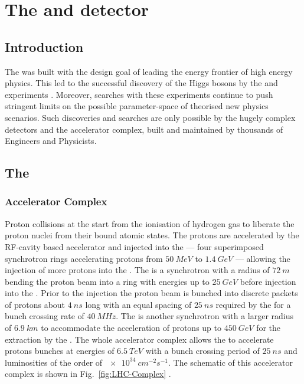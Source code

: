 \chapter{The \LHC and \CMS detector}
\label{chap:detector}


\section{Introduction}

The \LHC was built with the design goal of leading the energy frontier of high
energy physics. This led to the successful discovery of the Higgs bosons by the
\ATLAS \cite{Aad:1471031} and \CMS experiments \cite{Chatrchyan:1471016}.
Moreover, \BSM searches with these experiments continue to push stringent
limits on the possible parameter-space of theorised new physics scenarios. Such
discoveries and searches are only possible by the hugely complex detectors
and the \LHC accelerator complex, built and maintained by thousands of Engineers
and Physicists.

\section{The \LHC}

\subsection{Accelerator Complex}

Proton collisions at the \LHC start from the ionisation of hydrogen gas to
liberate the proton nuclei from their bound atomic states. The protons are
accelerated by the RF-cavity based accelerator \LINACTWO and injected into the
\PSBooster --- four superimposed synchrotron rings accelerating protons from
${\SI{50}{MeV}}$ to ${\SI{1.4}{GeV}}$ --- allowing the injection of more
protons into the \PS. The \PS is a synchrotron with a radius of
${\SI{72}{m}}$ bending the proton beam into a ring with energies up to
${\SI{25}{GeV}}$ before injection into the \SPS. Prior to the injection the
proton beam is bunched into discrete packets of protons about ${\SI{4}{ns}}$
long with an equal spacing of ${\SI{25}{ns}}$ required by the \LHC for a
bunch crossing rate of ${\SI{40}{MHz}}$. The \SPS is another synchrotron
with a larger radius of ${\SI{6.9}{km}}$ to accommodate the acceleration of
protons up to ${\SI{450}{GeV}}$ for the extraction by the \LHC. The whole
accelerator complex allows the \LHC to accelerate protons bunches at energies
of ${\SI{6.5}{TeV}}$ with a bunch crossing period of ${\SI{25}{ns}}$ and
luminosities of the order of ${\SI{e34}{cm^{-2}s^{-1}}}$. The schematic of 
this accelerator complex is shown in Fig.~\ref{fig:LHC-Complex} \cite{Benedikt:823808}.

